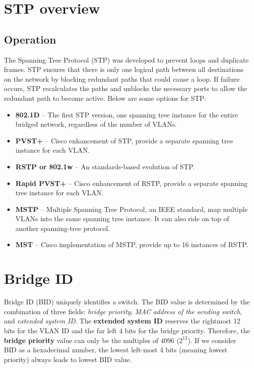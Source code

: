 \section{STP overview}

\subsection{Operation}

The Spanning Tree Protocol (STP) was developed to prevent loops and duplicate frames. STP ensures that there is only one logical path between all destinations on the network by blocking redundant paths that could cause a loop. If failure occurs, STP recalculates the paths and unblocks the necessary ports to allow the redundant path to become active. Below are some options for STP:

\begin{itemize}
\item \textbf{802.1D} -- The first STP version, one spanning tree instance for the entire bridged network, regardless of the number of VLANs.
\item \textbf{PVST+} -- Cisco enhancement of STP, provide a separate spanning tree instance for each VLAN.
\item \textbf{RSTP or 802.1w} -- An standards-based evolution of STP.
\item \textbf{Rapid PVST+} -- Cisco enhancement of RSTP, provide a separate spanning tree instance for each VLAN.
\item \textbf{MSTP} -- Multiple Spanning Tree Protocol, an IEEE standard, map multiple VLANs into the same spanning tree instance. It can also ride on top of another spanning-tree protocol.
\item \textbf{MST} -- Cisco implementation of MSTP, provide up to 16 instances of RSTP.
\end{itemize}

\section{Bridge ID}

Bridge ID (BID) uniquely identifies a switch. The BID value is determined by the combination of three fields: \emph{bridge priority}, \emph{MAC address of the sending switch}, and \emph{extended system ID}. The \textbf{extended system ID} reserves the rightmost 12 bits for the VLAN ID and the far left 4 bits for the bridge priority. Therefore, the \textbf{bridge priority} value can only be the multiples of 4096 ($2^{12}$). If we consider BID as a hexadecimal number, the lowest left-most 4 bits (meaning lowest priority) always leads to lowest BID value.\\

